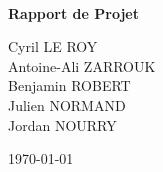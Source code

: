 \documentclass{exia_report}
\begin{document}
\begin{titlepage}
	\begin{center}

		\hfill \\[5cm]
		{ \huge \bfseries Rapport de Projet }

		\vfill
		\begin{minipage}{0.4\textwidth}
			\begin{center}
				\large
				Cyril LE ROY \\
				Antoine-Ali ZARROUK \\
				Benjamin ROBERT \\
				Julien NORMAND \\
				Jordan NOURRY
			\end{center}
		\end{minipage}

		{ \vfill \large \today }

	\end{center}
\end{titlepage}

\clearpage
\tableofcontents

\clearpage


\clearpage


\clearpage


\clearpage

\end{document}

